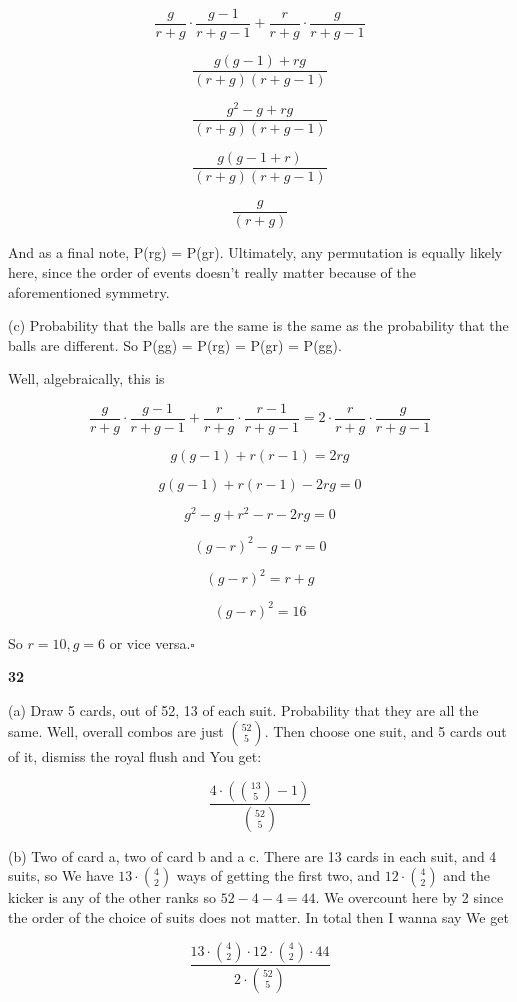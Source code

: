 \documentclass{article}
\newcommand{\qed}{\hfill$\square$}
\begin{document}
			$$\frac{g}{r+g} \cdot \frac{g-1}{r+g-1} + \frac{r}{r+g} \cdot \frac{g}{r+g-1} $$
			
			$$\frac{g(g-1) + rg}{(r+g)(r+g-1)} $$
			
			$$\frac{g^2 - g + rg}{(r+g)(r+g-1)} $$
			
			$$\frac{g(g - 1 + r)}{(r+g)(r+g-1)} $$
			
			$$\frac{g}{(r+g)} $$
			
			And as a final note, P(rg) = P(gr). Ultimately, any permutation is equally likely here, since the order of events doesn't really matter because of the aforementioned symmetry. 
			
			(c) Probability that the balls are the same is the same as the probability that the balls are different. So P(gg) = P(rg) = P(gr) = P(gg). 
			
			Well, algebraically, this is
			
			$$\frac{g}{r+g} \cdot \frac{g-1}{r+g-1} + \frac{r}{r+g} \cdot \frac{r-1}{r+g-1} = 2 \cdot \frac{r}{r+g} \cdot \frac{g}{r+g-1}$$
			
			$$g(g-1) + r(r-1) = 2rg$$
			
			$$g(g-1) + r(r-1) - 2rg = 0$$
			
			$$g^2 - g + r^2 -r - 2rg = 0$$
			
			$$(g-r)^2  -g -r = 0$$
			
			$$(g-r)^2 = r + g$$
			
			$$(g-r)^2 = 16$$
			
			So $r = 10, g = 6$ or vice versa.\qed
			
			\hfill
			
			\textbf{32}
			
			(a) Draw 5 cards, out of 52, 13 of each suit. Probability that they are all the same. Well, overall combos are just $\binom{52}{5}$. Then choose one suit, and 5 cards out of it, dismiss the royal flush and You get:
			
			$$\frac{4\cdot\left(\binom{13}{5} - 1\right)}{\binom{52}{5}}$$
			
			(b) Two of card a, two of card b and a c. There are 13 cards in each suit, and 4 suits, so We have $13\cdot\binom{4}{2}$ ways of getting the first two, and $12\cdot\binom{4}{2}$ and the kicker is any of the other ranks so $52-4-4 = 44$. We overcount here by 2 since the order of the choice of suits does not matter. In total then I wanna say We get
			
			$$\frac{13\cdot\binom{4}{2}\cdot 12\cdot\binom{4}{2} \cdot 44}{2\cdot\binom{52}{5}}$$
			
\end{document}
